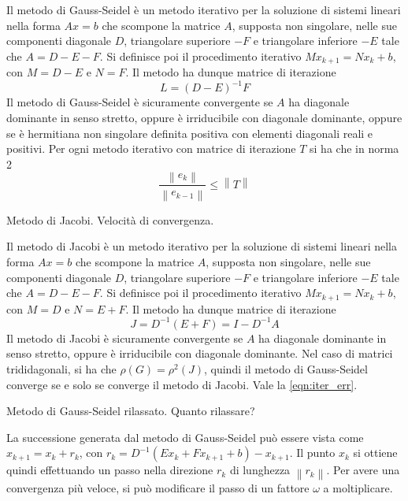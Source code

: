 \documentclass[answers, a4paper]{exam}
\newcommand{\norm}[1]{\left\lVert#1\right\rVert}
\begin{document}
\begin{questions}
	\begin{solution}Il metodo di Gauss-Seidel è un metodo iterativo per la soluzione di sistemi lineari nella forma $Ax = b$ che scompone la matrice $A$, supposta non singolare, nelle sue componenti diagonale $D$, triangolare superiore $-F$ e triangolare inferiore $-E$ tale che $A = D - E - F$.
	Si definisce poi il procedimento iterativo $Mx_{k+1} = Nx_k + b$, con $M = D - E$ e $N = F$. 
	Il metodo ha dunque matrice di iterazione \begin{equation}L = (D - E)^{-1} F\end{equation}
	Il metodo di Gauss-Seidel è sicuramente convergente se $A$ ha diagonale dominante in senso stretto, oppure è irriducibile con diagonale dominante, oppure se è hermitiana non singolare definita positiva con elementi diagonali reali e positivi.
	Per ogni metodo iterativo con matrice di iterazione $T$ si ha che in norma 2 \begin{equation}\frac{\norm{e_k}}{\norm{e_{k-1}}} \leq \norm{T}\label{eqn:iter_err}\end{equation}
	\end{solution}
	\question Metodo di Jacobi. Velocità di convergenza.
	\begin{solution}
		Il metodo di Jacobi è un metodo iterativo per la soluzione di sistemi lineari nella forma $Ax = b$ che scompone la matrice $A$, supposta non singolare, nelle sue componenti diagonale $D$, triangolare superiore $-F$ e triangolare inferiore $-E$ tale che $A = D - E - F$.
		Si definisce poi il procedimento iterativo $Mx_{k+1} = Nx_k + b$, con $M = D$ e $N = E + F$. 
		Il metodo ha dunque matrice di iterazione \begin{equation}J = D^{-1} (E + F) = I - D^{-1}A\end{equation} 
		Il metodo di Jacobi è sicuramente convergente se $A$ ha diagonale dominante in senso stretto, oppure è irriducibile con diagonale dominante.
		Nel caso di matrici trididagonali, si ha che $\rho(G) = \rho^2(J)$, quindi il metodo di Gauss-Seidel converge se e solo se converge il metodo di Jacobi.
		Vale la \cref{eqn:iter_err}.
	\end{solution}
	\question Metodo di Gauss-Seidel rilassato. Quanto rilassare?
	\begin{solution}
		La successione generata dal metodo di Gauss-Seidel può essere vista come $x_{k + 1} = x_k + r_k$, con $r_k = D^{-1} (Ex_k + Fx_{k + 1} + b) - x_{k + 1}$.
		Il punto $x_k$ si ottiene quindi effettuando un passo nella direzione $r_k$ di lunghezza $\norm{r_k}$. 
		Per avere una convergenza più veloce, si può modificare il passo di un fattore $\omega$ a moltiplicare.

\end{solution}
\end{questions}
\end{document}
